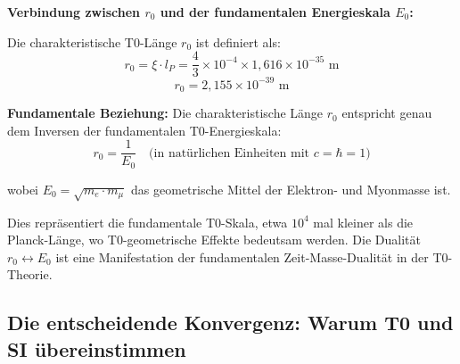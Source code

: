 \documentclass[12pt,a4paper]{article}
\begin{document}
	\begin{insight}
		\textbf{Verbindung zwischen $r_0$ und der fundamentalen Energieskala $E_0$:}
		
		Die charakteristische T0-L{\"a}nge $r_0$ ist definiert als:
		\begin{equation}
			r_0 = \xi \cdot l_P = \frac{4}{3} \times 10^{-4} \times 1{,}616 \times 10^{-35} \text{ m}
		\end{equation}
		\begin{equation}
			\boxed{r_0 = 2{,}155 \times 10^{-39} \text{ m}}
		\end{equation}
		
		\textbf{Fundamentale Beziehung:} Die charakteristische L{\"a}nge $r_0$ entspricht genau dem Inversen der fundamentalen T0-Energieskala:
		\begin{equation}
			r_0 = \frac{1}{E_0} \quad \text{(in nat{\"u}rlichen Einheiten mit } c = \hbar = 1\text{)}
		\end{equation}
		
		wobei $E_0 = \sqrt{m_e \cdot m_\mu}$ das geometrische Mittel der Elektron- und Myonmasse ist.
		
		Dies repr{\"a}sentiert die fundamentale T0-Skala, etwa $10^4$ mal kleiner als die Planck-L{\"a}nge, wo T0-geometrische Effekte bedeutsam werden. Die Dualit{\"a}t $r_0 \leftrightarrow E_0$ ist eine Manifestation der fundamentalen Zeit-Masse-Dualit{\"a}t in der T0-Theorie.
	\end{insight}
	
	\subsection{Die entscheidende Konvergenz: Warum T0 und SI {\"u}bereinstimmen}
	
\end{document}
